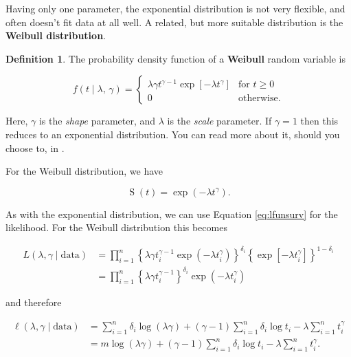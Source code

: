 \documentclass[
  openany]{book}
\theoremstyle{definition}
\newtheorem{definition}{Definition}[chapter]
\theoremstyle{definition}
\theoremstyle{definition}
\theoremstyle{definition}
\theoremstyle{remark}
\begin{document}
Having only one parameter, the exponential distribution is not very flexible, and often doesn't fit data at all well. A related, but more suitable distribution is the \textbf{Weibull distribution}.

\begin{definition}
The probability density function of a \textbf{Weibull} random variable is

\[
f\left(t\mid \lambda,\,\gamma\right) = 
\begin{cases}
\lambda\gamma t^{\gamma-1}\exp\left[{-\lambda t^{\gamma}}\right] & \text{for }t\geq{0}\\
0 & \text{otherwise}.
\end{cases}
\]

Here, \(\gamma\) is the \emph{shape} parameter, and \(\lambda\) is the \emph{scale} parameter. If \(\gamma=1\) then this reduces to an exponential distribution. You can read more about it, should you choose to, in \citet{collett_surv}.
\end{definition}

For the Weibull distribution, we have

\[\operatorname{S}\left(t\right) = \exp\left(-\lambda t^{\gamma}\right). \]

As with the exponential distribution, we can use Equation \eqref{eq:lfunsurv} for the likelihood. For the Weibull distribution this becomes

\begin{align*}
L\left(\lambda,\gamma\mid{\text{data}}\right) & = \prod\limits_{i=1}^n\left\lbrace \lambda \gamma t_i^{\gamma-1}\exp\left(-\lambda t_i^{\gamma}\right) \right\rbrace^{\delta_i} \left\lbrace \exp\left[-\lambda t_i^{\gamma}\right] \right\rbrace ^{1-\delta_i}\\
& = \prod\limits_{i=1}^n \left\lbrace \lambda\gamma t_i^{\gamma-1} \right\rbrace^{\delta_i} \exp\left(-\lambda t_i^{\gamma}\right)
\end{align*}

and therefore

\begin{align*}
\ell\left(\lambda,\gamma\mid{\text{data}}\right) & = \sum\limits_{i=1}^n \delta_i \log\left(\lambda\gamma\right) + \left(\gamma-1\right)\sum\limits_{i=1}^n\delta_i \log{t_i} - \lambda \sum\limits_{i=1}^n t_i^{\gamma}\\
& = m\log\left(\lambda\gamma\right) + \left(\gamma-1\right)\sum\limits_{i=1}^n \delta_i\log t_i - \lambda\sum\limits_{i=1}^n t_i^{\gamma}.
\end{align*}
\end{document}
